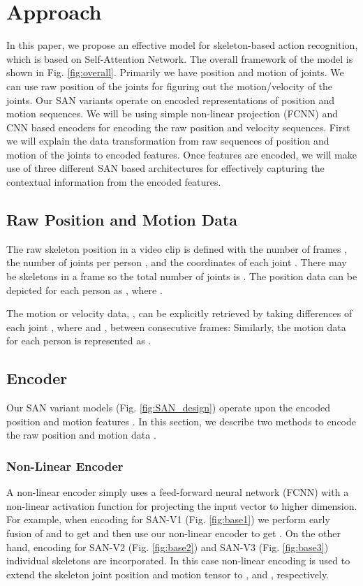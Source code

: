 \documentclass[10pt,twocolumn,letterpaper]{article}
\begin{document}
\section{Approach}
\label{sec:approach}
In this paper, we propose an effective model for skeleton-based action recognition, which is based on Self-Attention Network. The overall framework of the model is shown in Fig. \ref{fig:overall}. Primarily we have position and motion of joints. We can use raw position of the joints for figuring out the motion/velocity of the joints. Our SAN variants operate on encoded representations of position and motion sequences. We will be using simple non-linear projection (FCNN) and CNN based encoders for encoding the raw position and velocity sequences. First we will explain the data transformation from raw sequences of position and motion of the joints to encoded features. Once features are encoded, we will make use of three different SAN based architectures for effectively capturing the contextual information from the encoded features. 
\subsection{Raw Position and Motion Data }
The raw skeleton position  in a video clip is defined with the number of frames , the number of joints per person , and the coordinates of each joint . There may be  skeletons in a frame so the total number of joints is . The position data can be depicted for each person as , where .


The motion or velocity data, , can be explicitly retrieved by taking differences of each joint , where  and , between consecutive frames:
Similarly, the motion data for each person is represented as .






\subsection{Encoder}
Our SAN variant models (Fig. \ref{fig:SAN_design}) operate upon the encoded position  and motion features . In this section, we describe two methods to encode the raw position  and motion data .

\subsubsection{Non-Linear Encoder}
\label{non-linear-encoder}
A non-linear encoder simply uses a feed-forward neural network (FCNN) with a non-linear activation function for projecting the input vector to higher dimension. 
For example, when encoding for SAN-V1 (Fig. \ref{fig:base1}) we perform early fusion of  and  to get  and then use our non-linear encoder to get .  On the other hand, encoding for SAN-V2 (Fig. \ref{fig:base2}) and SAN-V3 (Fig. \ref{fig:base3}) individual skeletons are incorporated. 
In this case non-linear encoding is used to extend the skeleton joint position and motion tensor to , and , respectively.  
\end{document}
